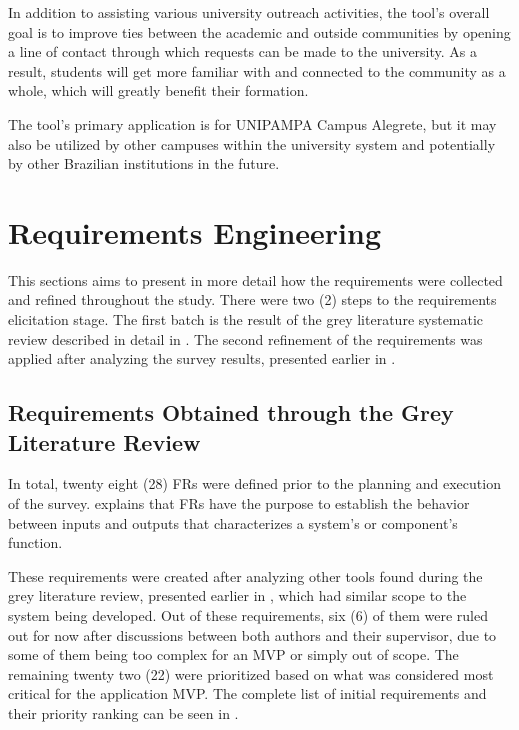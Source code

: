 In addition to assisting various university outreach activities, the tool's overall goal is to improve ties between the academic and outside communities by opening a line of contact through which requests can be made to the university.
As a result, students will get more familiar with and connected to the community as a whole, which will greatly benefit their formation.

The tool's primary application is for \ac{UNIPAMPA} Campus Alegrete, but it may also be utilized by other campuses within the university system and potentially by other Brazilian institutions in the future.

\section{Requirements Engineering}\label{ext:requirement-engineering}

This sections aims to present in more detail how the requirements were collected and refined throughout the study. There were two (2) steps to the requirements elicitation stage. The first batch is the result of the grey literature systematic review described in detail in . The second refinement of the requirements was applied after analyzing the survey results, presented earlier in .

\subsection{Requirements Obtained through the Grey Literature Review}\label{ext:requirements-grey}

In total, twenty eight (28) \acp{FR} were defined prior to the planning and execution of the survey. \textcite{Clarkson2005-sy} explains that \acp{FR} have the purpose to establish the behavior between inputs and outputs that characterizes a system's or component's function.

These requirements were created after analyzing other tools found during the grey literature review, presented earlier in , which had similar scope to the system being developed. Out of these requirements, six (6) of them were ruled out for now after discussions between both authors and their supervisor, due to some of them being too complex for an \ac{MVP} or simply out of scope. The remaining twenty two (22) were prioritized based on what was considered most critical for the application \ac{MVP}. The complete list of initial requirements and their priority ranking can be seen in .

